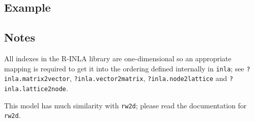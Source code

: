 \documentclass[a4paper,11pt]{article}
\begin{document}
\subsection*{Example}



\subsection*{Notes}
All indexes in the R-INLA library are one-dimensional so an
appropriate mapping is required to get it into the ordering defined
internally in \verb|inla|; see \verb|?inla.matrix2vector|,
\verb|?inla.vector2matrix|, \verb|?inla.node2lattice| and
\verb|?inla.lattice2node|.

This model has much similarity with \verb|rw2d|; please read the
documentation for \verb|rw2d|.

\end{document}
